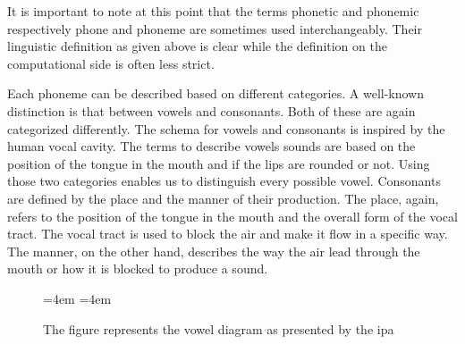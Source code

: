 It is important to note at this point that the terms phonetic and phonemic respectively phone and phoneme are sometimes used interchangeably. Their linguistic definition as given above is clear while the definition on the computational side is often less strict. 

Each phoneme can be described based on different categories. A well-known distinction is that between vowels and consonants. Both of these are again categorized differently. The schema for vowels and consonants is inspired by the human vocal cavity. The terms to describe vowels sounds are based on the position of the tongue in the mouth and if the lips are rounded or not. Using those two categories enables us to distinguish every possible vowel. Consonants are defined by the place and the manner of their production. The place, again, refers to the position of the tongue in the mouth and the overall form of the vocal tract. The vocal tract is used to block the air and make it flow in a specific way. The manner, on the other hand, describes the way the air lead through the mouth or how it is blocked to produce a sound. 
\citep{phonetics-video}

\begin{figure}
{\large
\vowelvunit=4em
\vowelhunit=4em
\begin{center}
\begin{vowel}
\end{vowel}
\end{center}}
\caption[Vowel chart]{The figure represents the vowel diagram as presented by the \ac{ipa}}
\label{fig:vowel-diagram}
\end{figure}



